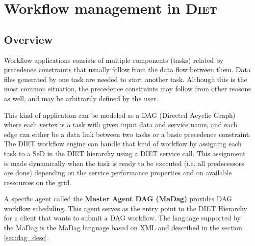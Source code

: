 
\chapter{Workflow management in \textsc{Diet}}

\section{Overview}

Workflow applications consists of multiple components (tasks) related by
precedence constraints that usually follow from the data flow between them. Data
files generated by one task are needed to start another task. Although this is
the most common situation, the precedence constraints may follow from other
reasons as well, and may be arbitrarily defined by the user.

This kind of application can be modeled as a DAG (Directed Acyclic Graph) where
each vertex is a task with given input data and service name, and each edge can
either be a data link between two tasks or a basic precedence constraint. The
DIET workflow engine can handle that kind of workflow by assigning each task
to a SeD in the DIET hierarchy using a DIET service call. This assignment is made
dynamically when the task is ready to be executed (i.e. all predecessors are done)
depending on the service performance properties and on available ressources on the
grid.

A specific agent called the \textbf{Master Agent DAG (MaDag)} provides
DAG workflow scheduling. This agent serves as the entry point to the DIET
Hierarchy for a client that wants to submit a DAG workflow. The language
supported by the MaDag is the MaDag language based on XML and described in the
section \ref{sec:dag_desc}.

